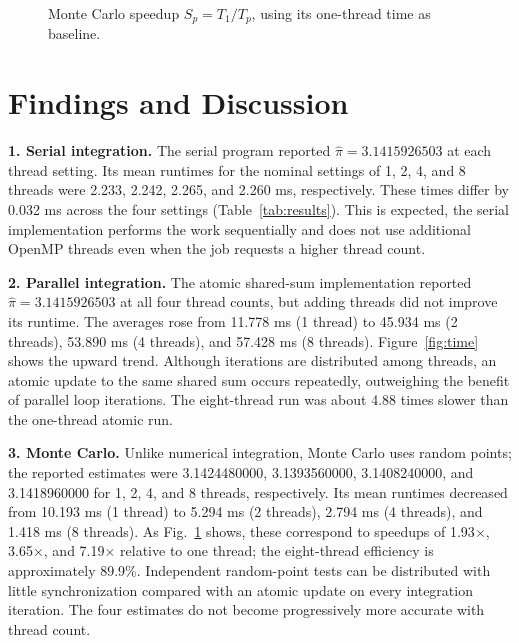 \documentclass[11pt]{article}
\begin{document}
\begin{figure}[t]
\centering
{}
\caption{Monte Carlo speedup $S_p=T_1/T_p$, using its one-thread time as baseline.}
\label{fig:speedup}
\end{figure}

\section{Findings and Discussion}
\textbf{1. Serial integration.} The serial program reported $\widehat\pi=3.1415926503$ at each thread setting. Its mean runtimes for the nominal settings of 1, 2, 4, and 8 threads were 2.233, 2.242, 2.265, and 2.260 ms, respectively. These times differ by 0.032 ms across the four settings (Table~\ref{tab:results}). This is expected, the serial implementation performs the work sequentially and does not use additional OpenMP threads even when the job requests a higher thread count.

\textbf{2. Parallel integration.} The atomic shared-sum implementation reported $\widehat\pi=3.1415926503$ at all four thread counts, but adding threads did not improve its runtime. The averages rose from 11.778 ms (1 thread) to 45.934 ms (2 threads), 53.890 ms (4 threads), and 57.428 ms (8 threads). Figure~\ref{fig:time} shows the upward trend. Although iterations are distributed among threads, an atomic update to the same shared sum occurs repeatedly, outweighing the benefit of parallel loop iterations. The eight-thread run was about 4.88 times slower than the one-thread atomic run.

\textbf{3. Monte Carlo.} Unlike numerical integration, Monte Carlo uses random points; the reported estimates were 3.1424480000, 3.1393560000, 3.1408240000, and 3.1418960000 for 1, 2, 4, and 8 threads, respectively. Its mean runtimes decreased from 10.193 ms (1 thread) to 5.294 ms (2 threads), 2.794 ms (4 threads), and 1.418 ms (8 threads). As Fig.~\ref{fig:speedup} shows, these correspond to speedups of 1.93$\times$, 3.65$\times$, and 7.19$\times$ relative to one thread; the eight-thread efficiency is approximately 89.9\%. Independent random-point tests can be distributed with little synchronization compared with an atomic update on every integration iteration. The four estimates do not become progressively more accurate with thread count.
\end{document}
